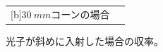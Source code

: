 \begin{figure}[htbp]
\begin{tabular}{cc}
\begin{minipage}[t]{0.45\hsize}
      [b]$\SI{30}{mm}$コーンの場合
      \label{fig:cone30_optimize2}
    \end{minipage}
  \end{tabular}
  \caption{光子が斜めに入射した場合の収率。}
\end{figure}
